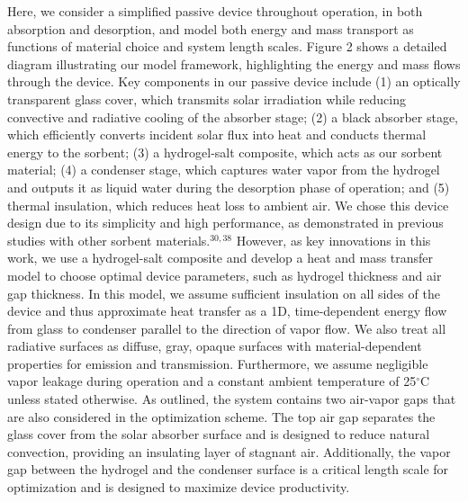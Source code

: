 \documentclass[11pt]{article}
\begin{document}
Here, we consider a simplified passive device throughout operation, in both absorption and desorption, and model both energy and mass transport as functions of material choice and system length scales. Figure 2 shows a detailed diagram illustrating our model framework, highlighting the energy and mass flows through the device. Key components in our passive device include (1) an optically transparent glass cover, which transmits solar irradiation while reducing convective and radiative cooling of the absorber stage; (2) a black absorber stage, which efficiently converts incident solar flux into heat and conducts thermal energy to the sorbent; (3) a hydrogel-salt composite, which acts as our sorbent material; (4) a condenser stage, which captures water vapor from the hydrogel and outputs it as liquid water during the desorption phase of operation; and (5) thermal insulation, which reduces heat loss to ambient air. We chose this device design due to its simplicity and high performance, as demonstrated in previous studies with other sorbent materials.$^{30,38}$ However, as key innovations in this work, we use a hydrogel-salt composite and develop a heat and mass transfer model to choose optimal device parameters, such as hydrogel thickness and air gap thickness. In this model, we assume sufficient insulation on all sides of the device and thus approximate heat transfer as a 1D, time-dependent energy flow from glass to condenser parallel to the direction of vapor flow. We also treat all radiative surfaces as diffuse, gray, opaque surfaces with material-dependent properties for emission and transmission. Furthermore, we assume negligible vapor leakage during operation and a constant ambient temperature of 25$^{\circ}$C unless stated otherwise. As outlined, the system contains two air-vapor gaps that are also considered in the optimization scheme. The top air gap separates the glass cover from the solar absorber surface and is designed to reduce natural convection, providing an insulating layer of stagnant air. Additionally, the vapor gap between the hydrogel and the condenser surface is a critical length scale for optimization and is designed to maximize device productivity.
\end{document}
